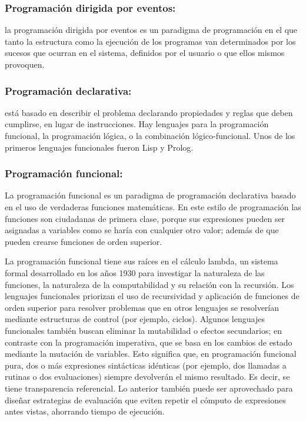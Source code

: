 \documentclass[11pt]{article}
\begin{document}
\subsubsection*{Programación dirigida por eventos:}
\label{sec:org393daa4}
la programación dirigida por
eventos es un paradigma de programación en el que tanto la estructura
como la ejecución de los programas van determinados por los sucesos
que ocurran en el sistema, definidos por el usuario o que ellos
mismos provoquen.


\subsubsection*{Programación declarativa:}
\label{sec:orga58785c}
 está basado en describir el problema
declarando propiedades y reglas que deben cumplirse, en lugar de
instrucciones. Hay lenguajes para la programación funcional, la
programación lógica, o la combinación lógico-funcional. Unos de los
primeros lenguajes funcionales fueron Lisp y Prolog.

\subsubsection*{Programación funcional:}
\label{sec:org91d9e74}

La programación funcional es un paradigma de programación declarativa
basado en el uso de verdaderas funciones matemáticas. En este estilo
de programación las funciones son ciudadanas de primera clase, porque
sus expresiones pueden ser asignadas a variables como se haría con
cualquier otro valor; además de que pueden crearse funciones de orden
superior.​

La programación funcional tiene sus raíces en el cálculo lambda, un
sistema formal desarrollado en los años 1930 para investigar la
naturaleza de las funciones, la naturaleza de la computabilidad y su
relación con la recursión. Los lenguajes funcionales priorizan el uso
de recursividad y aplicación de funciones de orden superior para
resolver problemas que en otros lenguajes se resolverían mediante
estructuras de control (por ejemplo, ciclos). Algunos lenguajes
funcionales también buscan eliminar la mutabilidad o efectos
secundarios; en contraste con la programación imperativa, que se basa
en los cambios de estado mediante la mutación de variables. Esto
significa que, en programación funcional pura, dos o más expresiones
sintácticas idénticas (por ejemplo, dos llamadas a rutinas o dos
evaluaciones) siempre devolverán el mismo resultado. Es decir, se
tiene transparencia referencial. Lo anterior también puede ser
aprovechado para diseñar estrategias de evaluación que eviten repetir
el cómputo de expresiones antes vistas, ahorrando tiempo de ejecución.
\end{document}
